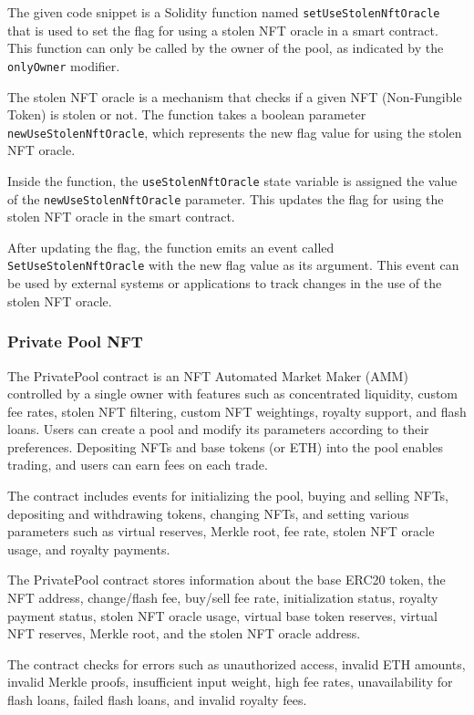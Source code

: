 The given code snippet is a Solidity function named
\texttt{setUseStolenNftOracle} that is used to set the flag for using a
stolen NFT oracle in a smart contract. This function can only be called
by the owner of the pool, as indicated by the \texttt{onlyOwner}
modifier.

The stolen NFT oracle is a mechanism that checks if a given NFT
(Non-Fungible Token) is stolen or not. The function takes a boolean
parameter \texttt{newUseStolenNftOracle}, which represents the new flag
value for using the stolen NFT oracle.

Inside the function, the \texttt{useStolenNftOracle} state variable is
assigned the value of the \texttt{newUseStolenNftOracle} parameter. This
updates the flag for using the stolen NFT oracle in the smart contract.

After updating the flag, the function emits an event called
\texttt{SetUseStolenNftOracle} with the new flag value as its argument.
This event can be used by external systems or applications to track
changes in the use of the stolen NFT oracle.

\hypertarget{private-pool-nft}{%
\subsubsection{Private Pool NFT}\label{private-pool-nft}}

The PrivatePool contract is an NFT Automated Market Maker (AMM)
controlled by a single owner with features such as concentrated
liquidity, custom fee rates, stolen NFT filtering, custom NFT
weightings, royalty support, and flash loans. Users can create a pool
and modify its parameters according to their preferences. Depositing
NFTs and base tokens (or ETH) into the pool enables trading, and users
can earn fees on each trade.

The contract includes events for initializing the pool, buying and
selling NFTs, depositing and withdrawing tokens, changing NFTs, and
setting various parameters such as virtual reserves, Merkle root, fee
rate, stolen NFT oracle usage, and royalty payments.

The PrivatePool contract stores information about the base ERC20 token,
the NFT address, change/flash fee, buy/sell fee rate, initialization
status, royalty payment status, stolen NFT oracle usage, virtual base
token reserves, virtual NFT reserves, Merkle root, and the stolen NFT
oracle address.

The contract checks for errors such as unauthorized access, invalid ETH
amounts, invalid Merkle proofs, insufficient input weight, high fee
rates, unavailability for flash loans, failed flash loans, and invalid
royalty fees.

